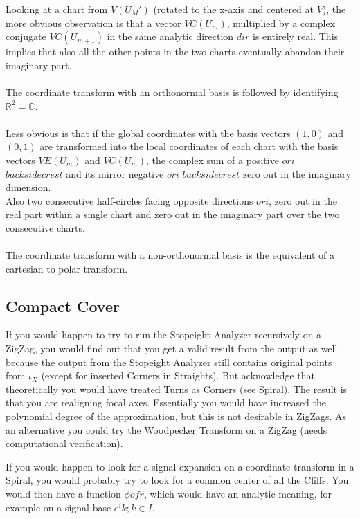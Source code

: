 \documentclass{report}
\begin{document}
Looking at a chart from $V(U_{M}')$ (rotated to the x-axis and centered at $V$), the more obvious observation is that a vector $VC(U_{m})$, multiplied by a complex conjugate $VC(U_{m+1})$ in the same analytic direction $dir$ is entirely real. This implies that also all the other points in the two charts eventually abandon their imaginary part.\\\\
The coordinate transform with an orthonormal basis is followed by identifying $\mathbb{R}^2=\mathbb{C}$.\\\\
Less obvious is that if the global coordinates with the basis vectors $(1,0)$ and $(0,1)$ are transformed into the local coordinates of each chart with the basis vectors $VE(U_{m})$ and $VC(U_{m})$, the complex sum of a positive $ori$ $backsidecrest$ and its mirror negative $ori$ $backsidecrest$ zero out in the imaginary dimension.\\
Also two consecutive half-circles facing opposite directions $ori$, zero out in the real part within a single chart and zero out in the imaginary part over the two consecutive charts.\\\\
The coordinate transform with a non-orthonormal basis is the equivalent of a cartesian to polar transform.

\subsection*{Compact Cover}

If you would happen to try to run the Stopeight Analyzer recursively on a ZigZag, you would find out that you get a valid result from the output as well, because the output from the Stopeight Analyzer still contains original points from $\iota_{X}$ (except for inserted Corners in Straights). But acknowledge that theoretically you would have treated Turns as Corners (see Spiral). The result is that you are realigning focal axes. Essentially you would have increased the polynomial degree of the approximation, but this is not desirable in ZigZags. As an alternative you could try the Woodpecker Transform on a ZigZag (needs computational verification).

If you would happen to look for a signal expansion on a coordinate transform in a Spiral, you would probably try to look for a common center of all the Cliffs. You would then have a function $\phi of r$, which would have an analytic meaning, for example on a signal base $e^ik;k \in I$.
\end{document}
